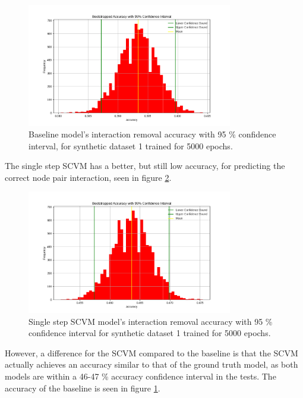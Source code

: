 \begin{figure}[H]
    \centering
    \includegraphics[width=0.8\textwidth]{0_images/rq1_baseline_accuracy.png}
    \caption{Baseline model's interaction removal accuracy with 95 \% confidence interval, for synthetic dataset 1 trained for 5000 epochs.}
    \label{fig:RQ1:baseline_accuracy}
\end{figure}
\noindent 
The single step SCVM has a better, but still low accuracy, for predicting the correct node pair interaction, seen in figure \ref{fig:RQ1:SCVM_accuracy}.
\begin{figure}[H]
    \centering
    \includegraphics[width=0.8\textwidth]{0_images/rq1_SCVM_accuracy.png}
    \caption{Single step SCVM model's interaction removal accuracy with 95 \% confidence interval for synthetic dataset 1 trained for 5000 epochs.}
    \label{fig:RQ1:SCVM_accuracy}
\end{figure}
\noindent
However, a difference for the SCVM compared to the baseline is that the SCVM actually achieves an accuracy similar to that of the ground truth model, as both  models are within a 46-47 \% accuracy confidence interval in the tests.
The accuracy of the baseline is seen in figure \ref{fig:RQ1:baseline_accuracy}.

